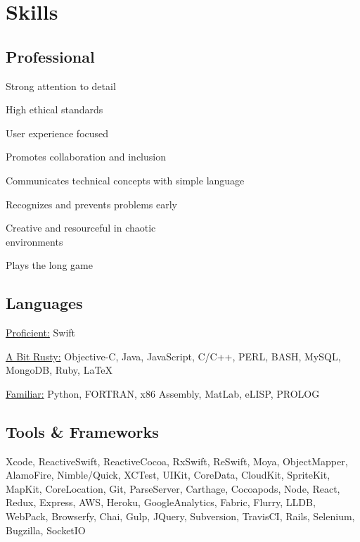 \documentclass[]{jhearn-resume}
\begin{document}
\begin{minipage}[t]{0.34\textwidth} 

\section{Skills}


\subsection{Professional}
\vspace{\topsep} 
\begin{tightemize}
\item Strong attention to detail
\item High ethical standards
\item User experience focused
\item Promotes collaboration and inclusion
\item Communicates technical concepts with simple language
\item Recognizes and prevents problems early
\item Creative and resourceful in chaotic \\ environments
\item Plays the long game
\end{tightemize}
\sectionsep

\subsection{Languages}
\underline{Proficient:} Swift \par
\underline{A Bit Rusty:} Objective-C, Java, JavaScript, C/C++, PERL, BASH, MySQL, MongoDB, Ruby, { \LaTeX} \par
\underline{Familiar:} Python, FORTRAN, x86 Assembly, MatLab, eLISP, PROLOG \\
\sectionsep
\vspace{-\topsep}

\subsection{Tools \& Frameworks}
\raggedright Xcode, ReactiveSwift, ReactiveCocoa, RxSwift, ReSwift, Moya, ObjectMapper, AlamoFire, Nimble/Quick, XCTest, UIKit, CoreData, CloudKit, SpriteKit, MapKit, CoreLocation, Git, ParseServer, Carthage, Cocoapods, Node, React, Redux, Express, AWS, Heroku, GoogleAnalytics, Fabric, Flurry, LLDB,  WebPack, Browserfy, Chai, Gulp, JQuery, Subversion, TravisCI, Rails, Selenium, Bugzilla, SocketIO
\sectionsep

\end{minipage}
\end{document}
